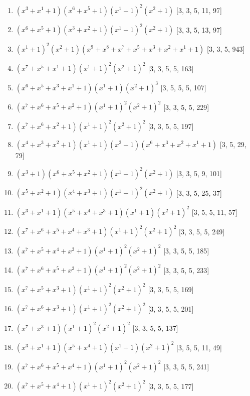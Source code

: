 \documentclass[10pt,twocolumn]{article}
\begin{document}
\begin{enumerate}
\item $(x^{3} + x^{1} + 1)(x^{6} + x^{5} + 1)(x^{1} + 1)^{2}(x^{2} + 1)$  [3, 3, 5, 11, 97]
\item $(x^{6} + x^{5} + 1)(x^{3} + x^{2} + 1)(x^{1} + 1)^{2}(x^{2} + 1)$  [3, 3, 5, 13, 97]
\item $(x^{1} + 1)^{2}(x^{2} + 1)(x^{9} + x^{8} + x^{7} + x^{5} + x^{3} + x^{2} + x^{1} + 1)$  [3, 3, 5, 943]
\item $(x^{7} + x^{5} + x^{1} + 1)(x^{1} + 1)^{2}(x^{2} + 1)^{2}$  [3, 3, 5, 5, 163]
\item $(x^{6} + x^{5} + x^{3} + x^{1} + 1)(x^{1} + 1)(x^{2} + 1)^{3}$  [3, 5, 5, 5, 107]
\item $(x^{7} + x^{6} + x^{5} + x^{2} + 1)(x^{1} + 1)^{2}(x^{2} + 1)^{2}$  [3, 3, 5, 5, 229]
\item $(x^{7} + x^{6} + x^{2} + 1)(x^{1} + 1)^{2}(x^{2} + 1)^{2}$  [3, 3, 5, 5, 197]
\item $(x^{4} + x^{3} + x^{2} + 1)(x^{1} + 1)(x^{2} + 1)(x^{6} + x^{3} + x^{2} + x^{1} + 1)$  [3, 5, 29, 79]
\item $(x^{3} + 1)(x^{6} + x^{5} + x^{2} + 1)(x^{1} + 1)^{2}(x^{2} + 1)$  [3, 3, 5, 9, 101]
\item $(x^{5} + x^{2} + 1)(x^{4} + x^{3} + 1)(x^{1} + 1)^{2}(x^{2} + 1)$  [3, 3, 5, 25, 37]
\item $(x^{3} + x^{1} + 1)(x^{5} + x^{4} + x^{3} + 1)(x^{1} + 1)(x^{2} + 1)^{2}$  [3, 5, 5, 11, 57]
\item $(x^{7} + x^{6} + x^{5} + x^{4} + x^{3} + 1)(x^{1} + 1)^{2}(x^{2} + 1)^{2}$  [3, 3, 5, 5, 249]
\item $(x^{7} + x^{5} + x^{4} + x^{3} + 1)(x^{1} + 1)^{2}(x^{2} + 1)^{2}$  [3, 3, 5, 5, 185]
\item $(x^{7} + x^{6} + x^{5} + x^{3} + 1)(x^{1} + 1)^{2}(x^{2} + 1)^{2}$  [3, 3, 5, 5, 233]
\item $(x^{7} + x^{5} + x^{3} + 1)(x^{1} + 1)^{2}(x^{2} + 1)^{2}$  [3, 3, 5, 5, 169]
\item $(x^{7} + x^{6} + x^{3} + 1)(x^{1} + 1)^{2}(x^{2} + 1)^{2}$  [3, 3, 5, 5, 201]
\item $(x^{7} + x^{3} + 1)(x^{1} + 1)^{2}(x^{2} + 1)^{2}$  [3, 3, 5, 5, 137]
\item $(x^{3} + x^{1} + 1)(x^{5} + x^{4} + 1)(x^{1} + 1)(x^{2} + 1)^{2}$  [3, 5, 5, 11, 49]
\item $(x^{7} + x^{6} + x^{5} + x^{4} + 1)(x^{1} + 1)^{2}(x^{2} + 1)^{2}$  [3, 3, 5, 5, 241]
\item $(x^{7} + x^{5} + x^{4} + 1)(x^{1} + 1)^{2}(x^{2} + 1)^{2}$  [3, 3, 5, 5, 177]

\end{enumerate}
\end{document}
